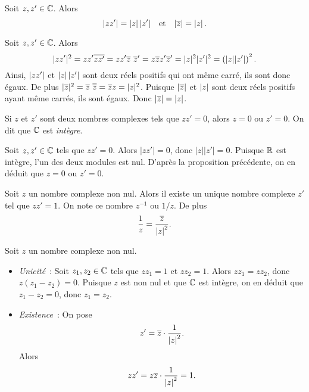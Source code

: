 \documentclass{magnoliaold}
\begin{document}
\begin{proposition}[utile=-3]
  Soit $z,z'\in\mathbb{C}$. Alors
  \[\left|z z'\right|=\left|z\right|\left|z'\right| \quad\!\text{et}\quad\! \left|\overline{z}\right|=\left|z\right|.\]
\end{proposition}

\begin{preuve}
Soit $z,z'\in\mathbb{C}$. Alors
\[|z z'|^2=z z'\conj{z z'}=z z'\conj{z}\ \conj{z}'=z\conj{z}z'\conj{z}'=|z|^2|z'|^2=\p{|z||z'|}^2.\]
Ainsi, $\left|z z'\right|$ et $\left|z\right|\left|z'\right|$ sont deux réels positifs qui ont même carré, ils sont donc égaux. De plus $|\conj{z}|^2=\conj{z}\ \conj{\conj{z}}=\conj{z}z=|z|^2$. Puisque $\left|\overline{z}\right|$ et $\left|z\right|$ sont deux réels positifs ayant même carrés, ils sont égaux. Donc $\left|\overline{z}\right|=\left|z\right|$.
\end{preuve}


\begin{proposition}
  Si $z$ et $z'$ sont deux nombres complexes tels que $z z'=0$, alors
  $z=0$ ou $z'=0$. On dit que $\mathbb{C}$ est \emph{intègre}.
\end{proposition}

\begin{preuve}
Soit $z,z'\in\mathbb{C}$ tels que $zz'=0$. Alors $|zz'|=0$, donc $|z||z'|=0$. Puisque $\mathbb{R}$ est intègre, l'un des deux modules est nul. D'après la proposition précédente, on en déduit que $z=0$ ou $z'=0$.

\end{preuve}
\begin{proposition}
  Soit $z$ un nombre complexe non nul. Alors il existe un unique nombre
  complexe $z'$ tel que $zz'=1$. On note ce nombre $z^{-1}$ ou $1/z$. De plus
  \[\frac{1}{z}=\frac{\overline{z}}{\left|z\right|^2}.\]
\end{proposition}

\begin{preuve}
Soit $z$ un nombre complexe non nul.
\begin{itemize}
\item \emph{Unicité}~: Soit $z_1,z_2\in\mathbb{C}$ tels que $z z_1=1$ et $z z_2=1$. Alors $z z_1=z z_2$, donc $z(z_1-z_2)=0$. Puisque $z$ est non nul et que $\mathbb{C}$ est intègre, on en déduit que $z_1-z_2=0$, donc $z_1=z_2$.
\item \emph{Existence}~: On pose
\[z'= \overline{z} \cdot \frac{1}{\left|z\right|^2}.\]
Alors
\[z z'=z\overline{z}\cdot\frac{1}{\left|z\right|^2} =1.\]
\end{itemize}
\end{preuve}
\end{document}
